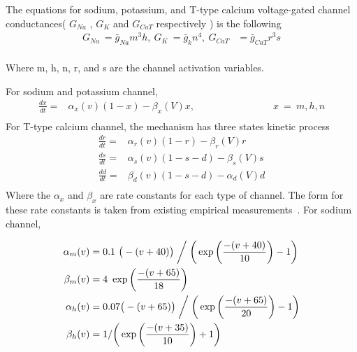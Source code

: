 The equations for sodium, potassium, and T-type calcium voltage-gated channel conductances( $G_{Na}$ , $G_{K}$ and $G_{CaT}$ respectively ) is the following
\begin{align*} 
G_{Na}\ =\bar{g}_{Na}m^{3}h ,\: G_{K}\ =\bar{g}_{k}n^{4},\: G_{CaT}&=\bar{g}_{CaT} r^{3}s\\
\end{align*}

Where m, h, n, r, and s are the channel activation variables. 

For sodium and potassium channel,
\begin{align*}
\frac{dx}{dt} =&\alpha_{x}(v)(1-x) - \beta_{x}(V)x, \hspace{8em} x\ =\ m,h,n \\
\end{align*}
For T-type calcium channel, the mechanism has three states kinetic process
\begin{align*}
\frac{dr}{dt} =& \alpha_{r}(v)(1-r) - \beta_r(V)r \\
\frac{ds}{dt} =& \alpha_{s}(v)(1-s-d) - \beta_{s}(V)s \\
\frac{d d}{dt} =& \beta_{d}(v)(1-s-d) - \alpha_d(V)d \\
\end{align*}
Where the $\alpha_x$ and $\beta_x$ are rate constants for each type of channel. The form for these rate constants is taken from existing empirical measurements~\cite{carnevale2006neuron, hodgkin1952quantitative, wang1991model}.
\clearpage
For sodium channel, 
 
\begin{align*} 
\alpha_{m}(v) &= 0.1\ \big(-(v+40)\big) \biggm/ \bigg( \exp \bigg( \frac{-(v+40)}{10} \bigg) - 1 \bigg)\\
\beta_{m}(v) &= 4\ \exp \bigg(\frac{-(v+65)}{18}\bigg)\\
\alpha_{h}(v) &= 0.07\big(-(v+65)\big) \biggm/ \bigg( \exp \bigg( \frac{-(v+65)}{20} \bigg) - 1 \bigg)\\
\beta_{h}(v) &= 1 / \bigg( \exp \bigg(\frac{-(v+35)}{10}\bigg) + 1 \bigg)\\
\end{align*}

